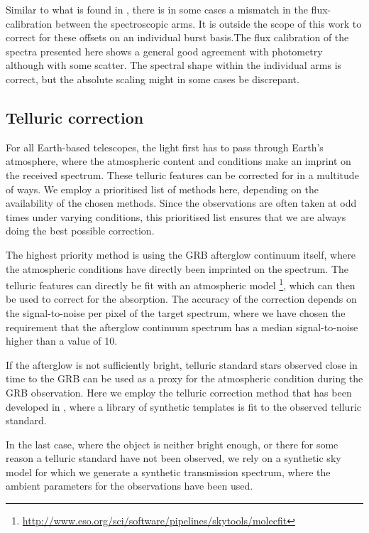 \documentclass[longauth]{aa}    %
\begin{document}
Similar to what is found in \citet{Lopez2016}, there is in some cases a mismatch
in the flux-calibration between the spectroscopic arms. It is outside the scope
of this work to correct for these offsets on an individual burst basis.The flux
calibration of the spectra presented here shows a general good agreement with
photometry although with some scatter. The spectral shape within the
individual arms is correct, but the absolute scaling might in some cases be
discrepant.

\subsection{Telluric correction} \label{tell_corr}

For all Earth-based telescopes, the light first has to pass through Earth's
atmosphere, where the atmospheric content and conditions make an imprint on the
received spectrum. These telluric features can be corrected for in a multitude
of ways. We employ a prioritised list of methods here, depending on the
availability of the chosen methods. Since the observations are often taken at
odd times under varying conditions, this prioritised list ensures that we are
always doing the best possible correction.

The highest priority method is using the GRB afterglow continuum itself, where
the atmospheric conditions have directly been imprinted on the spectrum. The
telluric features can directly be fit with an atmospheric model \citep[\texttt{Molecfit};][]{Smette2015,
	Kausch2015}\footnote{\url{http://www.eso.org/sci/software/pipelines/skytools/molecfit}}, which can then be used to correct for the absorption. The accuracy of the correction depends on the signal-to-noise per pixel of the target spectrum, where we have chosen the requirement that the afterglow continuum spectrum has a median signal-to-noise higher than a value of 10.

If the afterglow is not sufficiently bright, telluric standard stars observed
close in time to the GRB can be used as a proxy for the atmospheric
condition during the GRB observation. Here we employ the telluric correction
method that has been developed in \citet{Selsing2015}, where a library of
synthetic templates is fit to the observed telluric standard.

In the last case, where the object is neither bright enough, or there for some
reason a telluric standard have not been observed, we rely on a synthetic sky
model \citep{Noll2012, Jones2013} for which we generate a
synthetic transmission spectrum, where the ambient parameters for the
observations have been used.
\end{document}
